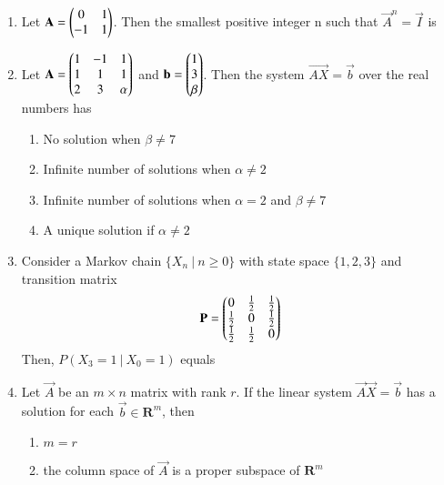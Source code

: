 \renewcommand{\theequation}{\theenumi}
\renewcommand{\thefigure}{\theenumi}
\renewcommand{\thetable}{\theenumi}
\begin{enumerate}[label=\thesection.\arabic*.,ref=\thesection.\theenumi]

\item Let $\mathbf{A}=\begin{pmatrix}0&1\\-1&1\end{pmatrix}$. Then the smallest positive integer n such that $\vec{A}^n=\vec{I}$ is
%
\\
\solution

%
\item Let $\mathbf{A} = \begin{pmatrix}1&-1&1\\1&1&1\\2&3&\alpha\end{pmatrix}$ and $\mathbf{b}= \begin{pmatrix}1\\3\\\beta\end{pmatrix}$. Then the system $\vec{AX}=\vec{b}$ over the real numbers has\\
\begin{enumerate}
    \item No solution when $\beta \ne 7$
    \item Infinite number of solutions when $\alpha \ne 2$
    \item Infinite number of solutions when $\alpha = 2$ and $\beta \ne 7$
    \item A unique solution if $\alpha \ne 2$
\end{enumerate}
%
\solution

%
\item Consider a Markov chain $\{X_n \: | \: n \geq 0\}$ with state space $\{1,2,3\}$ and transition matrix
\begin{align}
    \mathbf{P} = \begin{pmatrix}0 & \frac{1}{2} & \frac{1}{2} \\
    \frac{1}{2} & 0 & \frac{1}{2} \\
    \frac{1}{2} & \frac{1}{2} & 0\end{pmatrix} \nonumber
\end{align}
Then, $P(X_3 = 1 \: | \: X_0 = 1)$ equals
%
\\
\solution

%
\item 	Let $\vec{A}$ be an $m\times n$ matrix with rank $r$. If the linear system $\vec{A}\vec{X} = \vec{b}$ has a solution for each $\vec{b} \in \mathbf{R}^{m}$, then
	\begin{enumerate}
		\item $m=r$
		\item the column space of $\vec{A}$ is a proper subspace of $\mathbf{R}^{m}$ 

\end{enumerate}
\end{enumerate}
